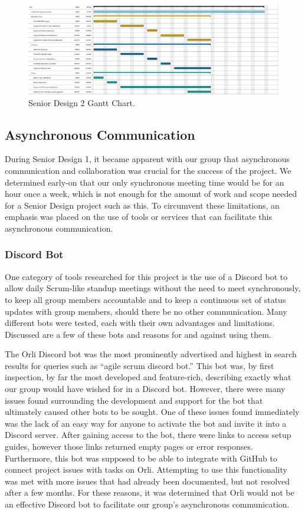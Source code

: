 \documentclass[
    paper=letter,
    parskip=half,
    fontsize=12pt,
    titlepage=firstiscover,
    toc=bibliography,
    numbers=endperiod
]{scrartcl}
\begin{document}
\begin{figure}[H]
    \includegraphics[width=\textwidth]{gantt-sd2}
    \caption{Senior Design 2 Gantt Chart.}
\end{figure}

\subsection{Asynchronous Communication}

During Senior Design 1, it became apparent with our group that
asynchronous communication and collaboration was crucial for the success
of the project. We determined early-on that our only synchronous meeting
time would be for an hour once a week, which is not enough for the
amount of work and scope needed for a Senior Design project such as
this. To circumvent these limitations, an emphasis was placed on the use
of tools or services that can facilitate this asynchronous
communication.

\subsubsection{Discord Bot}

One category of tools researched for this project is the use of a
Discord bot to allow daily Scrum-like standup meetings without the need
to meet synchronously, to keep all group members accountable and to keep
a continuous set of status updates with group members, should there be
no other communication. Many different bots were tested, each with their
own advantages and limitations. Discussed are a few of these bots and
reasons for and against using them.

The Orli Discord bot \cite{orli} was the most prominently advertised and
highest in search results for queries such as ``agile scrum discord
bot.'' This bot was, by first inspection, by far the most developed and
feature-rich, describing exactly what our group would have wished for in
a Discord bot. However, there were many issues found surrounding the
development and support for the bot that ultimately caused other bots to
be sought. One of these issues found immediately was the lack of an easy
way for anyone to activate the bot and invite it into a Discord server.
After gaining access to the bot, there were links to access setup
guides, however those links returned empty pages or error responses.
Furthermore, this bot was supposed to be able to integrate with GitHub
to connect project issues with tasks on Orli. Attempting to use this
functionality was met with more issues that had already been documented,
but not resolved after a few months. For these reasons, it was
determined that Orli would not be an effective Discord bot to facilitate
our group's asynchronous communication.
\end{document}
